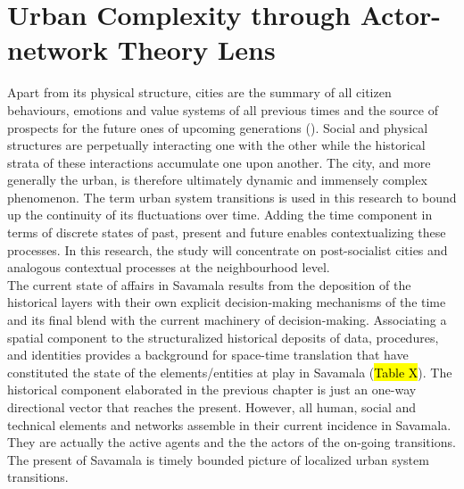 \documentclass[11pt]{report}
\begin{document}


\chapter{Urban Complexity through Actor-network Theory Lens}

Apart from its physical structure, cities are the summary of all citizen behaviours, emotions and value systems of all previous times and the source of prospects for the future ones of upcoming generations (\cite{Stojkov grad kultura politika}).
Social and physical structures are perpetually interacting one with the other while the historical strata of these interactions accumulate one upon another.
The city, and more generally the urban, is therefore ultimately dynamic and immensely complex phenomenon.
The term urban system transitions %
is used in this research to bound up the continuity of its fluctuations over time.
Adding the time component in terms of discrete states of past, present and future enables contextualizing these processes.
In this research, the study will concentrate on post-socialist cities and analogous contextual processes at the neighbourhood level.
\\

The current state of affairs in Savamala results from the deposition of the historical layers with their own explicit decision-making mechanisms of the time and its final blend with the current machinery of decision-making.
Associating a spatial component to the structuralized historical deposits of data, procedures, and identities provides a background for space-time translation that have constituted the state of the elements/entities at play in Savamala (\hl{Table X}). 
The historical component elaborated in the previous chapter is just an one-way directional vector that reaches the present.
However, all human, social and technical elements and networks assemble in their current incidence in Savamala. They are actually the active agents and the the actors of the on-going transitions. The present of Savamala is timely bounded picture of localized urban system transitions. 
\\
\end{document}
